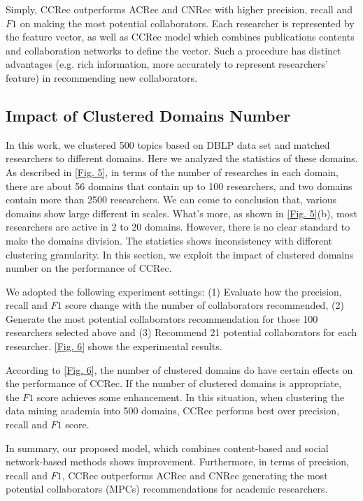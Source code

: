 \documentclass[10pt]{article}
\begin{document}
Simply, CCRec outperforms ACRec and CNRec with higher precision, recall and $F1$ on making the most potential collaborators. Each researcher is represented by the feature vector, as well as CCRec model which combines publications contents and collaboration networks to define the vector. Such a procedure has distinct advantages (e.g. rich information, more accurately to represent researchers' feature) in recommending new collaborators.

\subsection*{Impact of Clustered Domains Number}
In this work, we clustered 500 topics based on DBLP data set and matched researchers to different domains. Here we analyzed the statistics of these domains. As described in \autoref{Fig. 5}, in terms of the number of researches in each domain, there are about 56 domains that contain up to 100 researchers, and two domains contain more than 2500 researchers. We can come to conclusion that, various domains show large different in scales. What's more, as shown in \autoref{Fig. 5}(b), most researchers are active in 2 to 20 domains. However, there is no clear standard to make the domains division. The statistics shows inconsistency with different clustering granularity. In this section, we exploit the impact of clustered domains number on the performance of CCRec.

We adopted the following experiment settings: (1) Evaluate how the precision, recall and $F1$ score change with the number of collaborators recommended, (2) Generate the most potential collaborators recommendation for those 100 researchers selected above and (3) Recommend 21 potential collaborators for each researcher. \autoref{Fig. 6} shows the experimental results.


According to \autoref{Fig. 6}, the number of clustered domains do have certain effects on the performance of CCRec. If the number of clustered domains is appropriate, the $F1$ score achieves some enhancement. In this situation, when clustering the data mining academia into 500 domains, CCRec performs best over precision, recall and $F1$ score.

In summary, our proposed model, which combines content-based and social network-based methods shows improvement. Furthermore, in terms of precision, recall and $F1$, CCRec outperforms ACRec and CNRec generating the most potential collaborators (MPCs) recommendations for academic researchers.
\end{document}
